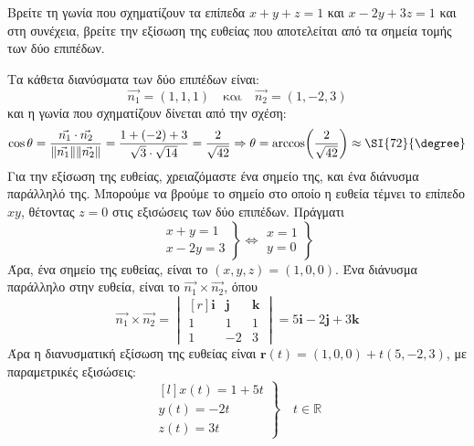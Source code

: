\begin{example}
  Βρείτε τη γωνία που σχηματίζουν τα επίπεδα $ x+y+z=1 $ και $ x-2y+3z=1 $ και 
  στη συνέχεια, βρείτε την εξίσωση της ευθείας που αποτελείται από τα σημεία τομής 
  των δύο επιπέδων.
\end{example}
\begin{solution}
  Τα κάθετα διανύσματα των δύο επιπέδων είναι:
  \[
    \vec{n_{1}} = (1,1,1) \quad \text{και} \quad \vec{n_{2}} = (1,-2,3) 
  \]
  και η γωνία που σχηματίζουν δίνεται από την σχέση:
  \[
    \cos{\theta} = \frac{\vec{n_{1}} \cdot \vec{n_{2}}}{\norm{\vec{n_{1}}}
    \norm{\vec{n_{2}}}} = \frac{1+(-2)+3}{\sqrt{3}\cdot \sqrt{14}} =
    \frac{2}{\sqrt{42}} \Rightarrow \theta = \arccos(\frac{2}{\sqrt{42}}) \approx 
    \SI{72}{\degree} 
  \] 
  Για την εξίσωση της ευθείας, χρειαζόμαστε ένα σημείο της, και ένα διάνυσμα 
  παράλληλό της. Μπορούμε να βρούμε το σημείο στο οποίο η ευθεία τέμνει το επίπεδο 
  $ xy $, θέτοντας $ z=0 $ στις εξισώσεις των δύο επιπέδων. Πράγματι 
  \[
    \left.
      \begin{matrix}
        x+y=1 \\
        x-2y=3
      \end{matrix} 
    \right\} \Leftrightarrow 
    \left.
      \begin{matrix}
        x=1 \\
        y=0
      \end{matrix} 
    \right\} 
  \] 
  Άρα, ένα σημείο της ευθείας, είναι το $ (x,y,z) = (1,0,0) $.
  Ένα διάνυσμα παράλληλο στην ευθεία, είναι το $ \vec{n_{1}} \times \vec{n_{2}} $, 
  όπου
  \[
    \vec{n_{1}} \times \vec{n_{2}} = 
    \begin{vmatrix*}[r]
      \mathbf{i} & \mathbf{j} & \mathbf{k} \\
      1 & 1 & 1 \\
      1 & -2 & 3
    \end{vmatrix*} = 5 \mathbf{i}- 2 \mathbf{j}+ 3 \mathbf{k} 
  \] 
  Άρα η διανυσματική εξίσωση της ευθείας είναι 
  $ \mathbf{r}(t) = (1,0,0) + t(5,-2,3) $, με παραμετρικές εξισώσεις:
  \[
    \left.
      \begin{matrix*}[l]
        x(t) = 1+5t \\
        y(t) = -2t \\
        z(t) = 3t
      \end{matrix*} 
    \right\} \quad t \in \mathbb{R}
  \]
\end{solution}




